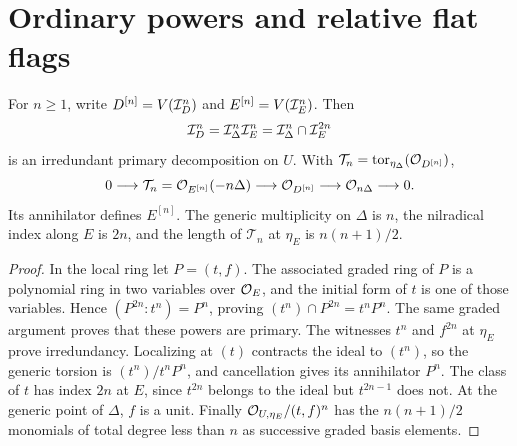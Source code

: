 \section{Ordinary powers and relative flat flags}
\label{sec:supplement-relative-powers}
\begin{corollary}\label{cor:powers}
For $n\ge1$, write $D^{[n]}=V(\mathcal I_D^n)$ and $E^{[n]}=V(\mathcal I_E^n)$.
Then
\begin{equation}\label{eq:powers}
 \mathcal I_D^n=\mathcal I_\Delta^n\mathcal I_E^n
           =\mathcal I_\Delta^n\cap\mathcal I_E^{2n}
\end{equation}
is an irredundant primary decomposition on $U$. With
$\mathcal T_n=\operatorname{tor}_{\eta_\Delta}(\mathcal O_{D^{[n]}})$,
\begin{equation}\label{eq:power-sequence}
 0\longrightarrow\mathcal T_n=\mathcal O_{E^{[n]}}(-n\Delta)
 \longrightarrow\mathcal O_{D^{[n]}}\longrightarrow\mathcal O_{n\Delta}
 \longrightarrow0.
\end{equation}
Its annihilator defines $E^{[n]}$. The generic multiplicity on
$\Delta$ is $n$, the nilradical index along $E$ is $2n$, and the
length of $\mathcal T_n$ at $\eta_E$ is $n(n+1)/2$.
\end{corollary}
\begin{proof}
In the local ring let $P=(t,f)$. The associated graded ring of $P$
is a polynomial ring in two variables over $\mathcal O_E$, and the initial
form of $t$ is one of those variables. Hence
$(P^{2n}:t^n)=P^n$, proving
$(t^n)\cap P^{2n}=t^nP^n$. The same graded argument proves that these
powers are primary. The witnesses $t^n$ and $f^{2n}$ at $\eta_E$
prove irredundancy. Localizing at $(t)$ contracts the ideal to $(t^n)$,
so the generic torsion is $(t^n)/t^nP^n$, and cancellation gives its
annihilator $P^n$. The class of $t$ has index $2n$ at $E$, since
$t^{2n}$ belongs to the ideal but $t^{2n-1}$ does not. At the generic
point of $\Delta$, $f$ is a unit. Finally
$\mathcal O_{U,\eta_E}/(t,f)^n$ has the $n(n+1)/2$ monomials of total
degree less than $n$ as successive graded basis elements.
\end{proof}

